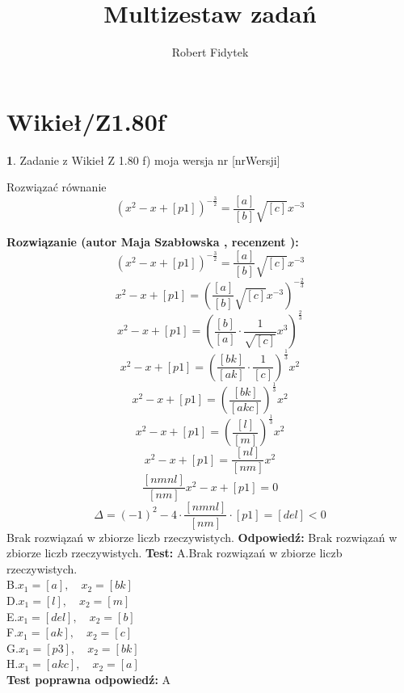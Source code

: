 \documentclass[12pt, a4paper]{article}
\title{Multizestaw zadań}
\author{Robert Fidytek}
\date{}
\theoremstyle{definition} %
\newtheorem{zad}{}
\newcommand{\kategoria}[1]{\section{#1}} %
\newcommand{\zadStart}[1]{\begin{zad}#1\newline} %
\newcommand{\zadStop}{\end{zad}}   %
\newcommand{\rozwStart}[2]{\noindent \textbf{Rozwiązanie (autor #1 , recenzent #2): }\newline} %
\newcommand{\rozwStop}{\newline}                                            %
\newcommand{\odpStart}{\noindent \textbf{Odpowiedź:}\newline}    %
\newcommand{\odpStop}{\newline}                                             %
\newcommand{\testStart}{\noindent \textbf{Test:}\newline} %
\newcommand{\testStop}{\newline} %
\newcommand{\kluczStart}{\noindent \textbf{Test poprawna odpowiedź:}\newline} %
\newcommand{\kluczStop}{\newline} %
\begin{document}
\maketitle


\kategoria{Wikieł/Z1.80f}
\zadStart{Zadanie z Wikieł Z 1.80 f)  moja wersja nr [nrWersji]}



Rozwiązać równanie 
$$(x^{2}-x+[p1])^{-\frac{3}{2}}=\frac{[a]}{[b]}\sqrt{[c]}x^{-3}$$
\zadStop

\rozwStart{Maja Szabłowska}{}
$$(x^{2}-x+[p1])^{-\frac{3}{2}}=\frac{[a]}{[b]}\sqrt{[c]}x^{-3}$$
$$x^{2}-x+[p1]=\left(\frac{[a]}{[b]}\sqrt{[c]}x^{-3}\right)^{-\frac{2}{3}}$$
$$x^{2}-x+[p1]=\left(\frac{[b]}{[a]}\cdot\frac{1}{\sqrt{[c]}}x^{3}\right)^{\frac{2}{3}}$$
$$x^{2}-x+[p1]=\left(\frac{[bk]}{[ak]}\cdot\frac{1}{[c]}\right)^{\frac{1}{3}}x^{2}$$
$$x^{2}-x+[p1]=\left(\frac{[bk]}{[akc]}\right)^{\frac{1}{3}}x^{2}$$
$$x^{2}-x+[p1]=\left(\frac{[l]}{[m]}\right)^{\frac{1}{3}}x^{2}$$
$$x^{2}-x+[p1]=\frac{[nl]}{[nm]}x^{2}$$
$$\frac{[nmnl]}{[nm]}x^{2}-x+[p1]=0$$
$$\Delta=(-1)^2 - 4\cdot\frac{[nmnl]}{[nm]}\cdot[p1]=[del]<0$$
Brak rozwiązań w zbiorze liczb rzeczywistych.
\rozwStop
\odpStart
Brak rozwiązań w zbiorze liczb rzeczywistych.
\odpStop
\testStart
A.Brak rozwiązań w zbiorze liczb rzeczywistych.\\
B.$x_{1}=[a], \quad x_{2}=[bk]$\\
D.$x_{1}=[l], \quad x_{2}=[m]$\\
E.$x_{1}=[del], \quad x_{2}=[b]$\\
F.$x_{1}=[ak], \quad x_{2}=[c]$\\
G.$x_{1}=[p3], \quad x_{2}=[bk]$\\
H.$x_{1}=[akc], \quad x_{2}=[a]$\\
\testStop
\kluczStart
A
\kluczStop
\end{document}
